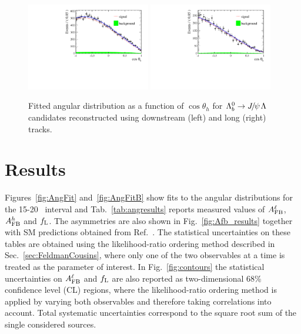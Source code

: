 %
\begin{figure}[h]
\centering
\includegraphics[width=0.48\textwidth]{Lmumu/figs/AngularDistribs/Fitted/AfbB_DD_jpsi.pdf}
\includegraphics[width=0.48\textwidth]{Lmumu/figs/AngularDistribs/Fitted/AfbB_LL_jpsi.pdf}
\caption{Fitted angular distribution as a function of $\cos\theta_h$ for $\Lb\to\jpsi\Lz$ candidates
reconstructed using downstream (left) and long (right) tracks.  }
\label{fig:AngFitBJpsi}
\end{figure}







\section{Results}
\label{sec:afb_results}

Figures~\ref{fig:AngFit} and~\ref{fig:AngFitB} show fits to the angular distributions
for the 15-20 \gevgevcccc ~\qsq interval and 
%
Tab.~\ref{tab:angresults} reports measured values of $A_{\rm FB}^\ell$, $A_{\rm FB}^h$ and $f_{\rm L}$.
The asymmetries are also shown in Fig.~\ref{fig:Afb_results} together with SM predictions obtained from 
Ref.~\cite{Detmold:2012vy}. The statistical uncertainties on these tables 
are obtained using the likelihood-ratio ordering method described in Sec.~\ref{sec:FeldmanCousins}, where only one of the two
observables at a time is treated as the parameter of interest. In Fig.~\ref{fig:contours} the statistical uncertainties
on $A_{\rm FB}^\ell$ and $f_{\rm L}$ are also reported as two-dimensional 68\;\% confidence level (CL) regions,
where the likelihood-ratio ordering method is applied by varying both observables and therefore taking
correlations into account. Total systematic uncertainties correspond to the square root sum of the
single considered sources.

